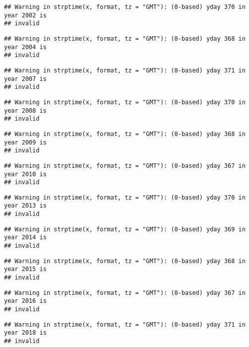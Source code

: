 \documentclass[
]{article}
\begin{document}
\begin{verbatim}
## Warning in strptime(x, format, tz = "GMT"): (0-based) yday 370 in year 2002 is
## invalid
\end{verbatim}

\begin{verbatim}
## Warning in strptime(x, format, tz = "GMT"): (0-based) yday 368 in year 2004 is
## invalid
\end{verbatim}

\begin{verbatim}
## Warning in strptime(x, format, tz = "GMT"): (0-based) yday 371 in year 2007 is
## invalid
\end{verbatim}

\begin{verbatim}
## Warning in strptime(x, format, tz = "GMT"): (0-based) yday 370 in year 2008 is
## invalid
\end{verbatim}

\begin{verbatim}
## Warning in strptime(x, format, tz = "GMT"): (0-based) yday 368 in year 2009 is
## invalid
\end{verbatim}

\begin{verbatim}
## Warning in strptime(x, format, tz = "GMT"): (0-based) yday 367 in year 2010 is
## invalid
\end{verbatim}

\begin{verbatim}
## Warning in strptime(x, format, tz = "GMT"): (0-based) yday 370 in year 2013 is
## invalid
\end{verbatim}

\begin{verbatim}
## Warning in strptime(x, format, tz = "GMT"): (0-based) yday 369 in year 2014 is
## invalid
\end{verbatim}

\begin{verbatim}
## Warning in strptime(x, format, tz = "GMT"): (0-based) yday 368 in year 2015 is
## invalid
\end{verbatim}

\begin{verbatim}
## Warning in strptime(x, format, tz = "GMT"): (0-based) yday 367 in year 2016 is
## invalid
\end{verbatim}

\begin{verbatim}
## Warning in strptime(x, format, tz = "GMT"): (0-based) yday 371 in year 2018 is
## invalid
\end{verbatim}
\end{document}
